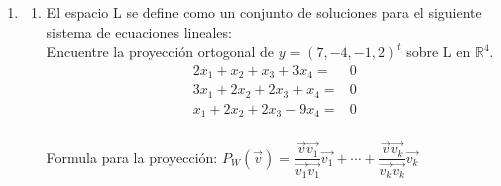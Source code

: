 \documentclass[12pt,a4paper]{report}
\begin{document}
\begin{enumerate}
Para ortogonalidad: 
\begin{align*}
    <x, \hat{e} >& = \Bigl(3 \cdot -\frac{48}{13} \Bigl) + \Bigl(2 \cdot \frac{72}{13} \Bigl) = - \frac{144}{13} + \frac{144}{13} = 0 \\
   & \Rightarrow x \bot \hat{e}
\end{align*}
5. Muestre que $||y||^2 = ||\hat{y}||^2 + ||y-\hat{y}||^2$
\begin{align*}
    ||y||^2 &= ||\hat{y}||^2 + ||y-\hat{y}||^2 \\
    &= <y,y> + <y,y> + <\hat{y} \hat{y}> -2<y,\hat{y}>\\
    &= <y,y> + <y,y> + <\hat{y} \hat{y}> - <y,y> -<\hat{y}\hat{y}>\\
    &= <y,y>\\
    & =||y||^2 
\end{align*}


\newpage
\item 
\begin{enumerate}
\item El espacio L se define como un conjunto de soluciones para el siguiente sistema de ecuaciones lineales:\\
Encuentre la proyección ortogonal de $y=(7,-4,-1,2)^{t}$ sobre L en $\mathbb{R}^{4}$.\\
\begin{align*}
2x_{1}+x_{2}+x_{3}+3x_{4}=&0\\
3x_{1}+2x_{2}+2x_{3}+x_{4}=&0\\
x_{1}+2x_{2}+2x_{3}-9x_{4}=&0\\
\end{align*}

Formula para la proyección: $P_{W}(\vec{v})=\dfrac{\vec{v}\vec{v_{1}}}{\vec{v_{1}}\vec{v_{1}}}\vec{v_{1}}+\cdots +\dfrac{\vec{v}\vec{v_{k}}}{\vec{v_{k}}\vec{v_{k}}}\vec{v_{k}}$\\


\end{enumerate}
\end{enumerate}
\end{document}
